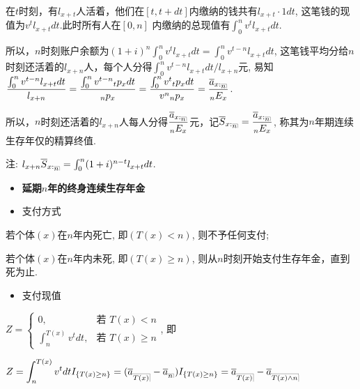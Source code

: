 \documentclass[a4paper,10pt]{ctexbook}
\makeatletter
\newcommand{\hei}{\CJKfamily{hei}}      %
\DeclareRobustCommand{\annu}[1]{_{%
    \def\arraystretch{0}%
    \setlength\arraycolsep{1pt}%
    \setlength\arrayrulewidth{.2pt}%
    \begin{array}[b]{@{}c|}\hline
        \\[\arraycolsep]%
        \scriptstyle #1%
    \end{array}%
}}
\makeatother
\begin{document}
在$t$时刻，有$l_{x+t}$人活着，他们在$[t, t+dt]$内缴纳的钱共有$l_{x+t}\cdot 1dt$, 这笔钱的现值为$v^tl_{x+t}dt$.此时所有人在$[0, n]$ 内缴纳的总现值有$ \int_0^{n} v^tl_{x+t}dt$.

所以，$n$时刻账户余额为$(1+i)^n\int_0^{n} v^tl_{x+t}dt=\int_0^{n} v^{t-n}l_{x+t}dt$, 这笔钱平均分给$n$时刻还活着的$l_{x+n}$人，每个人分得$\int_0^{n} v^{t-n}l_{x+t}dt/{l_{x+n}}$元, 易知$\dfrac{\int_0^{n} v^{t-n}l_{x+t}dt}{l_{x+n}}=\dfrac{\int_0^{n} v^{t-n}{}_tp_xdt}{{}_np_x}=\dfrac{\int_0^{n} v^{t}{}_tp_xdt}{v^n{}_np_x}=\dfrac{ \overline{a}_{x:\annu{n}}}{{}_nE_x}$.

所以，$n$时刻还活着的$l_{x+n}$人每人分得$\dfrac{ \overline{a}_{x:\annu{n}}}{{}_nE_x}$元，记$\overline{S}_{x:\annu{n}}=\dfrac{ \overline{a}_{x:\annu{n}}}{{}_nE_x}$, 称其为$n$年期连续生存年仅的精算终值.

注: $l_{x+n}\overline{S}_{x:\annu{n}}=\int_0^{n} (1+i)^{n-t}l_{x+t}dt$.


\begin{itemize}
    \item[{\bf\hei 四.}]{\bf\hei 延期$n$年的终身连续生存年金}
\end{itemize}

\begin{itemize}
    \item[{\bf\hei1.}] 支付方式
\end{itemize}

若个体$(x)$在$n$年内死亡, 即$(T(x)<n)$, 则不予任何支付;

若个体$(x)$在$n$年内未死, 即$(T(x)\ge n)$, 则从$n$时刻开始支付生存年金，直到死为止.


\begin{itemize}
    \item[{\bf\hei2.}] 支付现值
\end{itemize}

$Z=\begin{cases}
        0,                   & \text{若 } T(x) < n    \\
        \int_n^{T(x)} v^tdt, & \text{若 } T(x) \geq n
    \end{cases}$, 即

$\begin{aligned}
        Z =\int_n^{T(x)} v^tdtI_{\{T(x)\ge n\}} =(\overline{a}_{\annu{T(x)}}-\overline{a}_{\annu n})I_{\{T(x)\ge n\}} =\overline{a}_{\annu {T(x)}} - \overline{a}_{\annu {T(x) \land n}}
    \end{aligned}$
\end{document}
